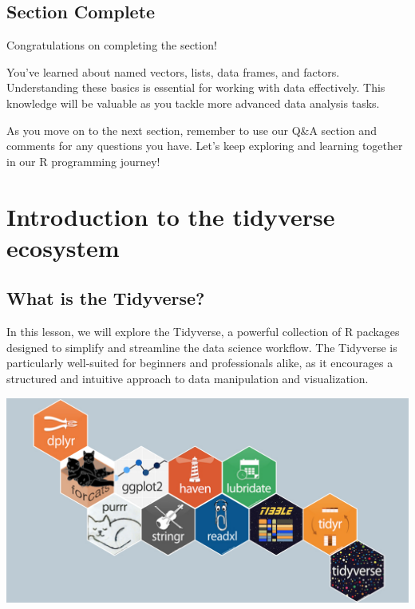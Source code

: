 \documentclass[
]{book}
\begin{document}
\hypertarget{section-complete-2}{%
\section{Section Complete}\label{section-complete-2}}

Congratulations on completing the section!

You've learned about named vectors, lists, data frames, and factors. Understanding these basics is essential for working with data effectively. This knowledge will be valuable as you tackle more advanced data analysis tasks.

As you move on to the next section, remember to use our Q\&A section and comments for any questions you have. Let's keep exploring and learning together in our R programming journey!

\hypertarget{introduction-to-the-tidyverse-ecosystem}{%
\chapter{Introduction to the tidyverse ecosystem}\label{introduction-to-the-tidyverse-ecosystem}}

\hypertarget{what-is-the-tidyverse}{%
\section{What is the Tidyverse?}\label{what-is-the-tidyverse}}

In this lesson, we will explore the Tidyverse, a powerful collection of R packages designed to simplify and streamline the data science workflow. The Tidyverse is particularly well-suited for beginners and professionals alike, as it encourages a structured and intuitive approach to data manipulation and visualization.

\includegraphics{images/tidyverse.png}
\end{document}
